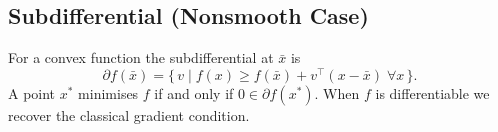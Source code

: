 \subsection{Subdifferential (Nonsmooth Case)}
For a convex function the subdifferential at \(\bar{x}\) is
\[
  \partial f(\bar{x})=\{\,v\mid f(x)\ge
  f(\bar{x})+v^\top(x-\bar{x})\;\forall x\,\}.
\]
A point \(x^*\) minimises \(f\) if and only if \(0\in\partial
f(x^*)\). When \(f\) is differentiable we recover the classical
gradient condition.

